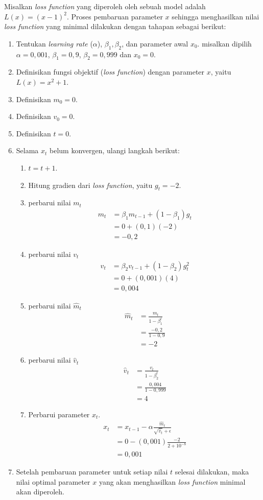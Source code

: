 \documentclass[a4paper,12pt]{report}
\begin{document}
Misalkan \textit{loss function} yang diperoleh oleh sebuah model adalah $L(x) = (x-1)^2 $. Proses pembaruan parameter $x$ sehingga menghasilkan nilai \textit{loss function} yang minimal dilakukan dengan tahapan sebagai berikut:
\begin{enumerate}
	\item Tentukan \textit{learning rate} ($\alpha$), $\beta_1, \beta_2$, dan parameter awal $x_0$. misalkan dipilih $\alpha = 0,001$, $\beta_1 = 0,9$, $\beta_2=0,999$ dan $x_0 = 0$. 
	\item Definisikan fungsi objektif (\textit{loss function}) dengan parameter $x$, yaitu $L(x) = x^2 + 1$.
	\item Definisikan $m_0 = 0$.
	\item Definisikan $v_0 = 0$.
	\item Definisikan $t=0$.
	\item Selama $x_t$ belum konvergen, ulangi langkah berikut: 
	\begin{enumerate}
		\item $t=t+1$.
		\item Hitung gradien dari \textit{loss function}, yaitu $g_t = -2$.
		\item perbarui nilai $m_t$ 
		\begin{align}
			m_t &= \beta_1m_{t-1}+(1-\beta_1)g_t \\
			    &= 0 + (0,1)(-2) \\
			    &= -0,2
		\end{align}
		\item perbarui nilai $v_t$
		\begin{align}
			v_t &= \beta_2v_{t-1}+(1-\beta_2)g_t^2 \\
			&= 0 + (0,001)(4) \\
			&= 0,004
		\end{align}
		\item perbarui nilai $\hat{m}_t$
		\begin{align}
			\hat{m}_t &= \frac{m_t}{1-\beta_1^t} \\
			&= \frac{-0,2}{1-0,9} \\
			&= -2 
		\end{align}
		\item perbarui nilai $\hat{v}_t$
		\begin{align}
			\hat{v}_t &= \frac{v_t}{1-\beta_2^t} \\
			&= \frac{0,004}{1-0,999} \\
			&= 4
		\end{align}
		\item Perbarui parameter $x_t$. 
		\begin{align}
			x_t &= x_{t-1}-\alpha\frac{\hat{m}_t}{\sqrt{\hat{v}_t}+\epsilon} \\
			&= 0 - (0,001)\frac{-2}{2+10^{-8}} \\
			&= 0,001
		\end{align}
	\end{enumerate}
	\item Setelah pembaruan parameter untuk setiap nilai $t$ selesai dilakukan, maka nilai optimal parameter $x$ yang akan menghasilkan \textit{loss function} minimal akan diperoleh.
\end{enumerate}
\end{document}
